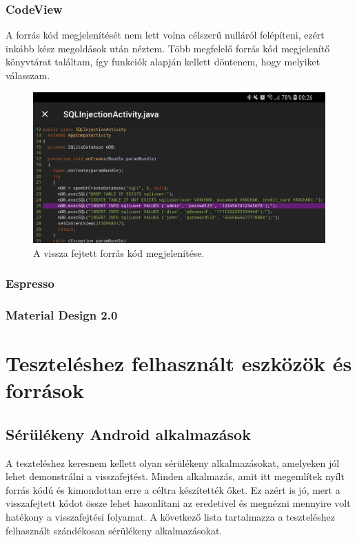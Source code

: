 \documentclass{thesis-ekf}
\theoremstyle{definition}
\theoremstyle{remark}
\begin{document}
\subsection{CodeView}

A forrás kód megjelenítését nem lett volna célszerű nulláról felépíteni, ezért inkább kész megoldások után néztem.
Több megfelelő forrás kód megjelenítő könyvtárat találtam, így funkciók alapján kellett döntenem, hogy melyiket válasszam.

\begin{figure}[!h]
	\centering
	\includegraphics[width=15cm]{kepek/code_view}
	\caption{A vissza fejtett forrás kód megjelenítése.}
	\label{dockerhub}
\end{figure}

\subsection{Espresso}

\subsection{Material Design 2.0}

\chapter{Teszteléshez felhasznált eszközök és források}\label{teszteles}

\section{Sérülékeny Android alkalmazások}

A teszteléshez keresnem kellett olyan sérülékeny alkalmazásokat, amelyeken jól lehet demonstrálni a visszafejtést.
Minden alkalmazás, amit itt megemlítek nyílt forrás kódú és kimondottan erre a céltra készítették őket.
Ez azért is jó, mert a visszafejtett kódot össze lehet hasonlítani az eredetivel és megnézni mennyire volt hatékony a visszafejtési folyamat.
A következő lista tartalmazza a teszteléshez felhasznált szándékosan sérülékeny alkalmazásokat.
\end{document}
